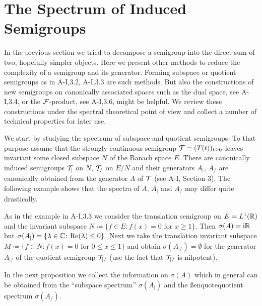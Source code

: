 \section{The Spectrum of Induced Semigroups}\label{sec:a3-4}
In the previous section we tried to decompose a semigroup into the direct sum of two, hopefully simpler objects.
Here we present other methods to reduce the complexity of a semigroup and its generator.
Forming subspace or quotient semigroups as in A-I,3.2, A-I,3.3 are such methods.
But also the constructions of new semigroups on canonically associated spaces such as the dual space, see A-I,3.4, or the $\mathcal{F}$-product, see A-I,3.6, might be helpful.
We review these constructions under the spectral theoretical point of view and collect a number of technical properties for later use.

We start by studying the spectrum of subspace and quotient semigroups.
To that purpose assume that the strongly continuous semigroup $\mathcal{T} = (T(t))_{t \geq 0}$ leaves invariant some closed subspace $N$ of the Banach space $E$.
There are canonically induced semigroups $\mathcal{T}_{|}$ on $N$, \resp $\mathcal{T}_{/}$ on $E/N$ and their generators $A_{|}$, \resp $A_{/}$ are canonically obtained from the generator $A$ of $\mathcal{T}$ (see A-I, Section 3).
The following example shows that the spectra of $A$, $A_{|}$ and $A_{/}$ may differ quite drastically.
\begin{example}\label{ex:a3-4.1}
As in the example in A-I,3.3 we consider the translation semigroup on $E = L^{1}(\mathbb{R})$ and the invariant subspace $N \coloneqq \{f \in E \colon f(x) = 0 \text{ for } x \geq 1\}$.
Then $\sigma(A) = \mathrm{i}\mathbb{R}$ but $\sigma(A_{|}) = \{\lambda \in \mathbb{C} \colon \text{Re}(\lambda) \leq 0\}$.
Next we take the translation invariant subspace $M \coloneqq \{f \in N \colon f(x) = 0 \text{ for } 0 \leq x \leq 1\}$ and obtain $\sigma(A_{|/}) = \emptyset$ for the generator $A_{|/}$ of the quotient semigroup $\mathcal{T}_{|/}$ (use the fact that $\mathcal{T}_{|/}$ is nilpotent).
\end{example}

In the next proposition we collect the information on $\sigma(A)$ which in general can be obtained from the \enquote{subspace spectrum} $\sigma(A_{|})$ and the ßenquote{quotient spectrum} $\sigma(A_{/})$.

